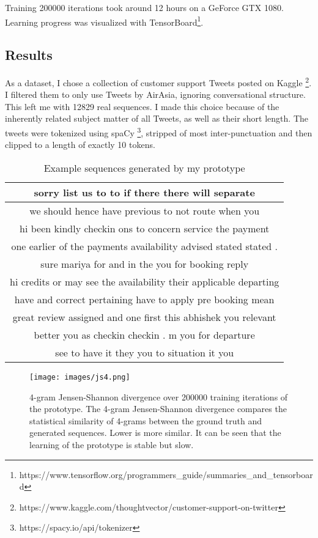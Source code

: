 \documentclass[a4paper,conference]{IEEEtran}
\begin{document}
Training 200000 iterations took around 12 hours on a GeForce GTX 1080. Learning progress was visualized with TensorBoard\footnote{https://www.tensorflow.org/programmers_guide/summaries_and_tensorboard}.

\subsection{Results}
As a dataset, I chose a collection of customer support Tweets posted on Kaggle \footnote{https://www.kaggle.com/thoughtvector/customer-support-on-twitter}. I filtered them to only use Tweets by AirAsia, ignoring conversational structure. This left me with 12829 real sequences. I made this choice because of the inherently related subject matter of all Tweets, as well as their short length.
The tweets were tokenized using spaCy \footnote{https://spacy.io/api/tokenizer}, stripped of most inter-punctuation and then clipped to a length of exactly 10 tokens. 

\begin{table}[h]
\caption{Example sequences generated by my prototype}
\label{table:prototype-result}
\begin{center}
\begin{tabular}{|c|}
\hline
sorry list us to to if there there will separate\\
\hline
we should hence have previous to not route when you\\
\hline
hi been kindly checkin ons to concern service the payment\\
\hline
one earlier of the payments availability advised stated stated .\\
\hline
sure mariya for and in the you for booking reply\\
\hline
hi credits or may see the availability their applicable departing\\
\hline
have and correct pertaining have to apply pre booking mean\\
\hline
great review assigned and one first this abhishek you relevant\\
\hline
better you as checkin checkin . m you for departure\\
\hline
see to have it they you to situation it you\\
\hline
\end{tabular}
\end{center}
\end{table}

   \begin{figure}[thpb]
      \centering
      \texttt{[image: images/js4.png]}
      \caption{4-gram Jensen-Shannon divergence over 200000 training iterations of the prototype. The 4-gram Jensen-Shannon divergence compares the statistical similarity of 4-grams between the ground truth and generated sequences. Lower is more similar. It can be seen that the learning of the prototype is stable but slow.}
      \label{fig:prototype-js-divergence}
   \end{figure}
   
\end{document}

